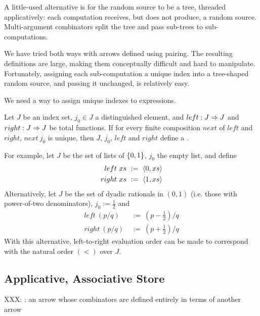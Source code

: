 \documentclass[preprint]{sigplanconf}
\begin{document}
A little-used alternative is for the random source to be a tree, threaded applicatively:
each computation receives, but does not produce, a random source.
Multi-argument combinators split the tree and pass sub-trees to sub-computations.

We have tried both ways with arrows defined using pairing.
The resulting definitions are large, making them conceptually difficult and hard to manipulate.
Fortunately, assigning each sub-computation a unique index into a tree-shaped random source, and passing it unchanged, is relatively easy.

We need a way to assign unique indexes to expressions.

\begin{definition}
Let $J$ be an index set, $j_0 \in J$ a distinguished element, and $left : J \Rightarrow J$ and $right : J \Rightarrow J$ be total functions.
If for every finite composition $next$ of $left$ and $right$, $next~j_0$ is unique, then $J$, $j_0$, $left$ and $right$ define a .
\end{definition}

For example, let $J$ be the set of lists of $\{{0,1}\}$, $j_0$ the empty list, and define
\begin{equation}
\begin{aligned}
	left~xs &\ := \ \langle{0,xs}\rangle
\\
	right~xs &\ := \ \langle{1,xs}\rangle
\end{aligned}
\end{equation}
Alternatively, let $J$ be the set of dyadic rationals in $(0,1)$ (i.e. those with power-of-two denominators), $j_0 := \tfrac{1}{2}$ and
\begin{equation}
\begin{aligned}
	left~(p/q) &\ := \ (p-\tfrac{1}{2})/q
\\
	right~(p/q) &\ := \ (p+\tfrac{1}{2})/q
\end{aligned}
\end{equation}
With this alternative, left-to-right evaluation order can be made to correspond with the natural order $(<)$ over $J$.

\subsection{Applicative, Associative Store}

XXX: : an arrow whose combinators are defined entirely in terms of another arrow
\end{document}
